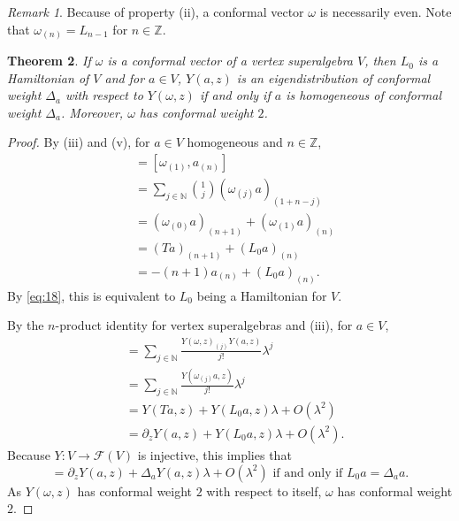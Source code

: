 \documentclass[a4paper, 12pt, reqno]{amsart}
\newtheorem{theorem}{Theorem}[section]
\theoremstyle{remark}
\newtheorem{remark}[theorem]{Remark}
\numberwithin{equation}{subsection}
\begin{document}
\begin{remark}
  \label{rmk:19}
  Because of property (ii), a conformal vector $\omega$ is necessarily even.
  Note that $\omega_{(n)} = L_{n - 1}$ for $n \in \mathbb{Z}$.
\end{remark}

\begin{theorem}
  \label{thr:21}
  If $\omega$ is a conformal vector of a vertex superalgebra $V$, then $L_0$ is a Hamiltonian of $V$ and for $a \in V$, $Y(a, z)$ is an eigendistribution of conformal weight $\Delta_a$ with respect to $Y(\omega, z)$ if and only if $a$ is homogeneous of conformal weight $\Delta_a$.
  Moreover, $\omega$ has conformal weight $2$.
\end{theorem}

\begin{proof}
  By (iii) and (v), for $a \in V$ homogeneous and $n \in \mathbb{Z}$,
  \begin{align*}
    [L_0, a_{(n)}] &= [\omega_{(1)}, a_{(n)}] \\
    &= \sum_{j \in \mathbb{N}}\binom{1}{j}(\omega_{(j)}a)_{(1 + n - j)} \\
    &= (\omega_{(0)}a)_{(n + 1)} + (\omega_{(1)}a)_{(n)} \\
    &= (Ta)_{(n + 1)} + (L_0a)_{(n)} \\
    &= -(n + 1)a_{(n)} + (L_0a)_{(n)}.
  \end{align*}
  By \eqref{eq:18}, this is equivalent to $L_0$ being a Hamiltonian for $V$.

  By the $n$-product identity for vertex superalgebras and (iii), for $a \in V$,
  \begin{align*}
    [Y(\omega, z)_{\lambda}Y(a, z)] &= \sum_{j \in \mathbb{N}}\frac{Y(\omega, z)_{(j)}Y(a, z)}{j!}\lambda^j \\
    &= \sum_{j \in \mathbb{N}}\frac{Y(\omega_{(j)}a, z)}{j!}\lambda^j \\
    &= Y(Ta, z) + Y(L_0a, z)\lambda + O(\lambda^2) \\
    &= \partial_zY(a, z) + Y(L_0a, z)\lambda + O(\lambda^2).
  \end{align*}
  Because $Y: V \to \mathcal{F}(V)$ is injective, this implies that
  \begin{equation*}
    [Y(\omega, z)_{\lambda}Y(a, z)] = \partial_zY(a, z) + \Delta_aY(a, z)\lambda + O(\lambda^2)\text{ if and only if }L_0a = \Delta_aa.
  \end{equation*}
  As $Y(\omega, z)$ has conformal weight $2$ with respect to itself, $\omega$ has conformal weight $2$.
\end{proof}
\end{document}
